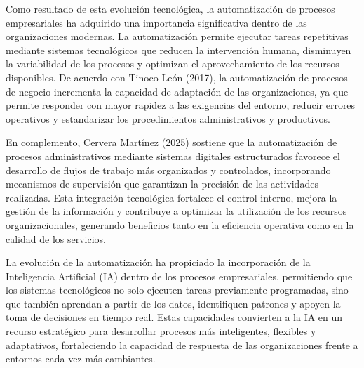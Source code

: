 Como resultado de esta evolución tecnológica, la automatización de procesos empresariales ha adquirido una importancia significativa dentro de las organizaciones modernas. La automatización permite ejecutar tareas repetitivas mediante sistemas tecnológicos que reducen la intervención humana, disminuyen la variabilidad de los procesos y optimizan el aprovechamiento de los recursos disponibles. De acuerdo con Tinoco-León (2017), la automatización de procesos de negocio incrementa la capacidad de adaptación de las organizaciones, ya que permite responder con mayor rapidez a las exigencias del entorno, reducir errores operativos y estandarizar los procedimientos administrativos y productivos.

En complemento, Cervera Martínez (2025) sostiene que la automatización de procesos administrativos mediante sistemas digitales estructurados favorece el desarrollo de flujos de trabajo más organizados y controlados, incorporando mecanismos de supervisión que garantizan la precisión de las actividades realizadas. Esta integración tecnológica fortalece el control interno, mejora la gestión de la información y contribuye a optimizar la utilización de los recursos organizacionales, generando beneficios tanto en la eficiencia operativa como en la calidad de los servicios.

La evolución de la automatización ha propiciado la incorporación de la Inteligencia Artificial (IA) dentro de los procesos empresariales, permitiendo que los sistemas tecnológicos no solo ejecuten tareas previamente programadas, sino que también aprendan a partir de los datos, identifiquen patrones y apoyen la toma de decisiones en tiempo real. Estas capacidades convierten a la IA en un recurso estratégico para desarrollar procesos más inteligentes, flexibles y adaptativos, fortaleciendo la capacidad de respuesta de las organizaciones frente a entornos cada vez más cambiantes.

